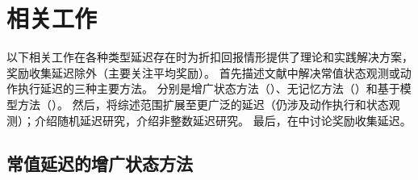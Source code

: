 
\section{相关工作}
\label{sec:related_works}

以下相关工作在各种类型延迟存在时为折扣回报情形提供了理论和实践解决方案，奖励收集延迟除外（主要关注平均奖励）。
首先描述文献中解决常值状态观测或动作执行延迟的三种主要方法。
分别是增广状态方法（）、无记忆方法（）和基于模型方法（）。
然后，将综述范围扩展至更广泛的延迟（仍涉及动作执行和状态观测）；介绍随机延迟研究，介绍非整数延迟研究。
最后，在中讨论奖励收集延迟。

\subsection{常值延迟的增广状态方法}
\label{subsec:augmented_related}

